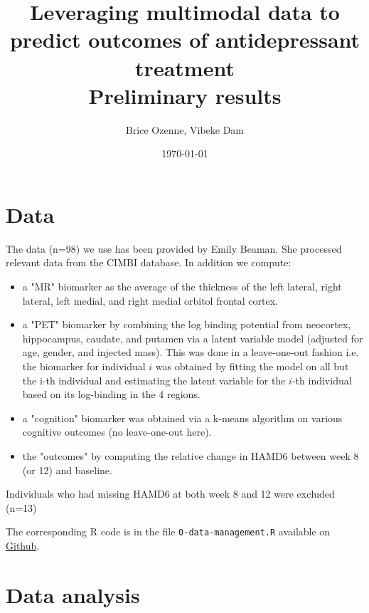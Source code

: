 \documentclass[12pt]{article}
\author{Brice Ozenne, Vibeke Dam}
\date{\today}
\title{Leveraging multimodal data to predict outcomes of antidepressant treatment\\\medskip
\large Preliminary results}
\begin{document}
\maketitle

\section{Data}
\label{sec:orga85803e}

The data (n=98) we use has been provided by Emily Beaman. She processed
relevant data from the CIMBI database. In addition we compute:
\begin{itemize}
\item a "MR" biomarker as the average of the thickness of the left
lateral, right lateral, left medial, and right medial orbitol
frontal cortex.
\item a "PET" biomarker by combining the log binding potential from
neocortex, hippocampus, caudate, and putamen via a latent variable
model (adjusted for age, gender, and injected mass). This was done
in a leave-one-out fashion i.e. the biomarker for individual \(i\)
was obtained by fitting the model on all but the i-th individual and
estimating the latent variable for the \(i\)-th individual based on
its log-binding in the 4 regions.
\item a "cognition" biomarker was obtained via a k-means algorithm on
various cognitive outcomes (no leave-one-out here).
\item the "outcomes" by computing the relative change in HAMD6 between week 8 (or 12) and baseline.
\end{itemize}
Individuals who had missing HAMD6 at both week 8 and 12 were excluded (n=13)

\bigskip

The corresponding R code is in the file \texttt{0-data-management.R} available on \href{https://github.com/bozenne/article-predictionNP1BD3/code-data-analysis}{Github}.

\clearpage

\section{Data analysis}
\label{sec:org5175886}
\end{document}
